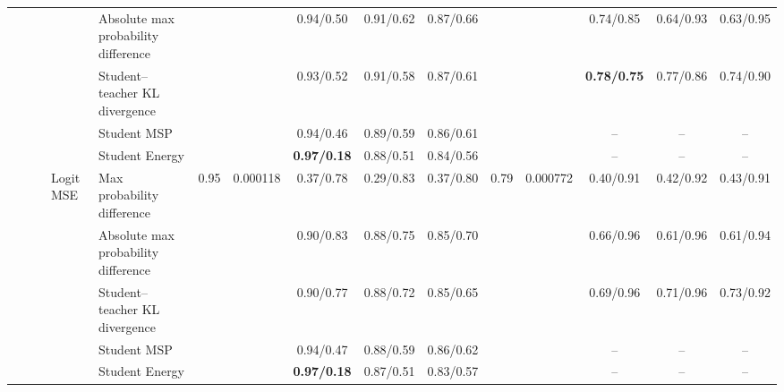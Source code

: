 \documentclass[border=2pt]{standalone}
\begin{document}
\begin{tabular}{lllllcccccccccc}
 &  &  &  & Absolute max probability difference &  &  & 0.94/0.50 & 0.91/0.62 & 0.87/0.66 &  &  & 0.74/0.85 & 0.64/0.93 & 0.63/0.95 \\
 &  &  &  & Student--teacher KL divergence &  &  & 0.93/0.52 & 0.91/0.58 & 0.87/0.61 &  &  & \textbf{0.78/0.75} & 0.77/0.86 & 0.74/0.90 \\
 &  &  &  & Student MSP &  &  & 0.94/0.46 & 0.89/0.59 & 0.86/0.61 &  &  & -- & -- & -- \\
 &  &  &  & Student Energy &  &  & \textbf{0.97/0.18} & 0.88/0.51 & 0.84/0.56 &  &  & -- & -- & -- \\
 &  &  & Logit MSE & Max probability difference & 0.95 & 0.000118 & 0.37/0.78 & 0.29/0.83 & 0.37/0.80 & 0.79 & 0.000772 & 0.40/0.91 & 0.42/0.92 & 0.43/0.91 \\
 &  &  &  & Absolute max probability difference &  &  & 0.90/0.83 & 0.88/0.75 & 0.85/0.70 &  &  & 0.66/0.96 & 0.61/0.96 & 0.61/0.94 \\
 &  &  &  & Student--teacher KL divergence &  &  & 0.90/0.77 & 0.88/0.72 & 0.85/0.65 &  &  & 0.69/0.96 & 0.71/0.96 & 0.73/0.92 \\
 &  &  &  & Student MSP &  &  & 0.94/0.47 & 0.88/0.59 & 0.86/0.62 &  &  & -- & -- & -- \\
 &  &  &  & Student Energy &  &  & \textbf{0.97/0.18} & 0.87/0.51 & 0.83/0.57 &  &  & -- & -- & -- \\
\bottomrule
\end{tabular}
\end{document}
